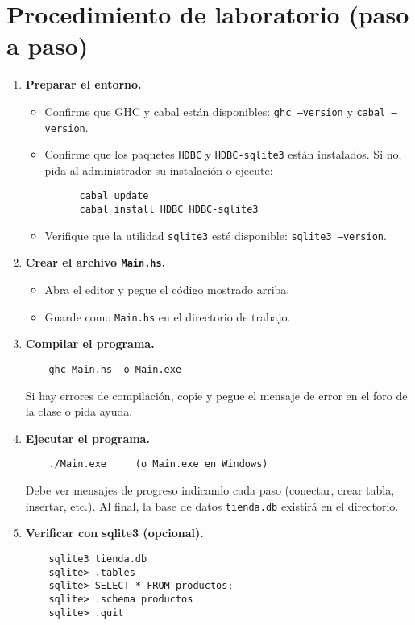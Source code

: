 \documentclass[12pt]{article}
\begin{document}
\section*{Procedimiento de laboratorio (paso a paso)}
\begin{enumerate}
  \item \textbf{Preparar el entorno.}
    \begin{itemize}
      \item Confirme que GHC y cabal est\'an disponibles: \texttt{ghc --version} y \texttt{cabal --version}.
      \item Confirme que los paquetes \texttt{HDBC} y \texttt{HDBC-sqlite3} est\'an instalados. Si no, pida al administrador su instalaci\'on o ejecute:
      \begin{verbatim}
      cabal update
      cabal install HDBC HDBC-sqlite3
      \end{verbatim}
      \item Verifique que la utilidad \texttt{sqlite3} est\'e disponible: \texttt{sqlite3 --version}.
    \end{itemize}

  \item \textbf{Crear el archivo \texttt{Main.hs}.}
    \begin{itemize}
      \item Abra el editor y pegue el c\'odigo mostrado arriba.
      \item Guarde como \texttt{Main.hs} en el directorio de trabajo.
    \end{itemize}

  \item \textbf{Compilar el programa.}
    \begin{verbatim}
    ghc Main.hs -o Main.exe
    \end{verbatim}
    Si hay errores de compilaci\'on, copie y pegue el mensaje de error en el foro de la clase o pida ayuda.

  \item \textbf{Ejecutar el programa.}
    \begin{verbatim}
    ./Main.exe     (o Main.exe en Windows)
    \end{verbatim}
    Debe ver mensajes de progreso indicando cada paso (conectar, crear tabla, insertar, etc.). Al final, la base de datos \texttt{tienda.db} existir\'a en el directorio.

  \item \textbf{Verificar con sqlite3 (opcional).}
    \begin{verbatim}
    sqlite3 tienda.db
    sqlite> .tables
    sqlite> SELECT * FROM productos;
    sqlite> .schema productos
    sqlite> .quit
    \end{verbatim}


\end{enumerate}
\end{document}
